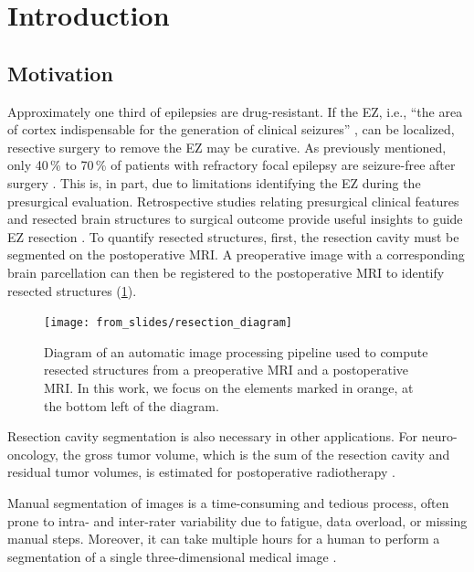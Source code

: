 \section{Introduction}

\subsection{Motivation}

Approximately one third of epilepsies are drug-resistant.
If the \ac{EZ}, i.e., ``the area of cortex indispensable for the generation of clinical seizures'' \cite{rosenow_presurgical_2001}, can be localized, resective surgery to remove the \ac{EZ} may be curative.
As previously mentioned, only 40\,\% to 70\,\% of patients with refractory focal epilepsy are seizure-free after surgery \cite{jobst_resective_2015}.
This is, in part, due to limitations identifying the \ac{EZ} during the presurgical evaluation.
Retrospective studies relating presurgical clinical features and resected brain structures to surgical outcome provide useful insights to guide \ac{EZ} resection \cite{jobst_resective_2015}.
To quantify resected structures, first, the resection cavity must be segmented on the postoperative \ac{MRI}.
A preoperative image with a corresponding brain parcellation can then be registered to the postoperative \ac{MRI} to identify resected structures (\cref{fig:resection_diagram}).

\begin{figure}
  \centering
  \texttt{[image: from\_slides/resection\_diagram]}
  \caption[Diagram of a pipeline to compute resected structures]{
    Diagram of an automatic image processing pipeline used to compute resected structures from a preoperative \ac{MRI} and a postoperative \ac{MRI}.
    In this work, we focus on the elements marked in orange, at the bottom left of the diagram.
  }
  \label{fig:resection_diagram}
\end{figure}

Resection cavity segmentation is also necessary in other applications.
For neuro-oncology, the gross tumor volume, which is the sum of the resection cavity and residual tumor volumes, is estimated for postoperative radiotherapy \cite{ermis_fully_2020}.

Manual segmentation of images is a time-consuming and tedious process, often prone to intra- and inter-rater variability due to fatigue, data overload, or missing manual steps.
Moreover, it can take multiple hours for a human to perform a segmentation of a single three-dimensional medical image \cite{sharma_automated_2010}.

